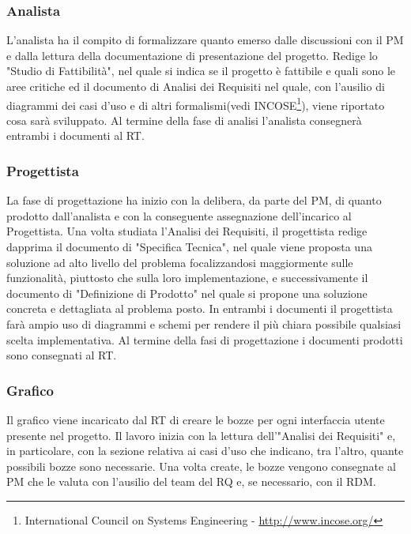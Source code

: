 \subsubsection{Analista}
L\textquoteright{}analista ha il compito di formalizzare quanto emerso dalle discussioni con il PM e
dalla lettura della documentazione di presentazione del progetto. Redige lo "Studio di Fattibilit\`{a}", nel quale si indica se il progetto \`{e} fattibile e quali sono le aree critiche ed il documento di Analisi dei Requisiti nel quale, con l\textquoteright{}ausilio di diagrammi dei casi d\textquoteright{}uso e di altri formalismi(vedi INCOSE\footnote{International Council on Systems Engineering - \url{http://www.incose.org/}}), viene riportato cosa sar\`{a} sviluppato. Al termine della fase di analisi l\textquoteright{}analista consegner\`{a} entrambi i documenti al RT.

\subsubsection{Progettista}
La fase di progettazione ha inizio con la delibera, da parte del PM, di quanto prodotto
dall\textquoteright{}analista e con la conseguente assegnazione dell\textquoteright{}incarico al Progettista. Una volta
studiata l\textquoteright{}Analisi dei Requisiti, il progettista redige dapprima il documento di "Specifica
Tecnica", nel quale viene proposta una soluzione ad alto livello del problema focalizzandosi
maggiormente sulle funzionalit\`{a}, piuttosto che sulla loro implementazione, e successivamente
il documento di "Definizione di Prodotto" nel quale si propone una soluzione concreta e
dettagliata al problema posto. In entrambi i documenti il progettista far\`{a} ampio uso di
diagrammi e schemi per rendere il pi\`{u} chiara possibile qualsiasi scelta implementativa.
Al termine della fasi di progettazione i documenti prodotti sono consegnati al RT.

\subsubsection{Grafico}
Il grafico viene incaricato dal RT di creare le bozze per ogni interfaccia utente presente
nel progetto. Il lavoro inizia con la lettura dell\textquoteright{}"Analisi dei Requisiti" e, in particolare,
con la sezione relativa ai casi d\textquoteright{}uso che indicano, tra l\textquoteright{}altro, quante possibili bozze sono
necessarie. Una volta create, le bozze vengono consegnate al PM che le valuta con
l\textquoteright{}ausilio del team del RQ e, se necessario, con il RDM.


